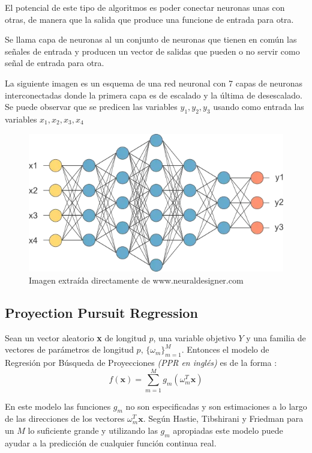 El potencial de este tipo de algoritmos es poder conectar neuronas unas con otras, de manera que la salida que produce una funcione de entrada para otra.
\begin{defi}
Se llama capa de neuronas al un conjunto de neuronas que tienen en común las señales de entrada y producen un vector de salidas que pueden o no servir como señal de entrada para otra. 
\end{defi}

\noindent La siguiente imagen es un esquema de una red neuronal con 7 capas de neuronas interconectadas donde la primera capa es de escalado y la última de desescalado. Se puede observar que se predicen las variables $y_1, y_2, y_3$ usando como entrada las variables $x_1,x_2,x_3,x_4$ 

\begin{figure}[h]
\centering
\includegraphics[scale=0.45]{Documentos Extra/red-neuronal-grande.png}
\caption{Imagen extraída directamente de www.neuraldesigner.com}
\end{figure}
\subsection{Proyection Pursuit Regression}

\noindent Sean un vector aleatorio \textbf{x} de longitud $p$, una variable objetivo $Y$ y una familia de vectores de parámetros de longitud $p$, $\lbrace \omega_m\rbrace_{m=1}^M$. Entonces el modelo de Regresión por Búsqueda de Proyecciones \textit{(PPR en inglés)} es de la forma :
\begin{equation}
f(\textbf{x})=\sum_{m=1}^M g_m(\omega_m^T \textbf{x})
\end{equation}

\noindent En este modelo las funciones $g_m$ no son especificadas y son estimaciones a lo largo de las direcciones de los vectores $\omega_m^T \textbf{x}$. Según Hastie, Tibshirani y Friedman \cite{Hastie 2001} para un $M$ lo suficiente grande y utilizando las $g_m$ apropiadas este modelo puede ayudar a la predicción de cualquier función continua real. 

